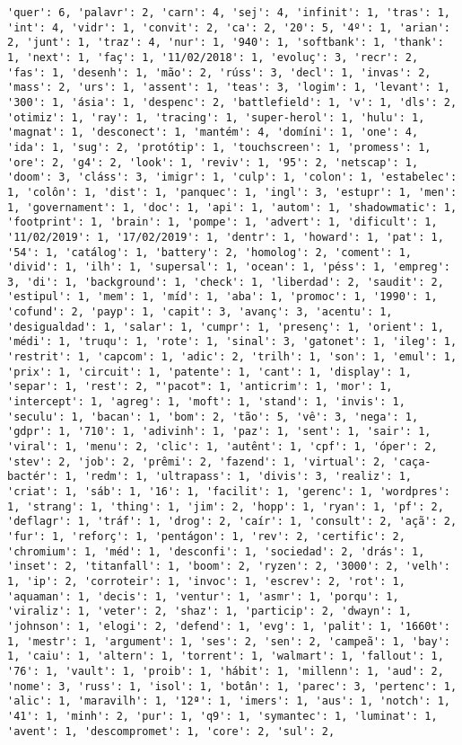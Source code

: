 \documentclass[11pt]{article}
\begin{document}
\begin{Verbatim}[commandchars=\\\{\}]
'quer': 6, 'palavr': 2, 'carn': 4, 'sej': 4, 'infinit': 1, 'tras': 1, 'int': 4, 'vidr': 1, 'convit': 2, 'ca': 2, '20': 5, '4º': 1, 'arian': 2, 'junt': 1, 'traz': 4, 'nur': 1, '940': 1, 'softbank': 1, 'thank': 1, 'next': 1, 'faç': 1, '11/02/2018': 1, 'evoluç': 3, 'recr': 2, 'fas': 1, 'desenh': 1, 'mão': 2, 'rúss': 3, 'decl': 1, 'invas': 2, 'mass': 2, 'urs': 1, 'assent': 1, 'teas': 3, 'logim': 1, 'levant': 1, '300': 1, 'ásia': 1, 'despenc': 2, 'battlefield': 1, 'v': 1, 'dls': 2, 'otimiz': 1, 'ray': 1, 'tracing': 1, 'super-herol': 1, 'hulu': 1, 'magnat': 1, 'desconect': 1, 'mantém': 4, 'domíni': 1, 'one': 4, 'ida': 1, 'sug': 2, 'protótip': 1, 'touchscreen': 1, 'promess': 1, 'ore': 2, 'g4': 2, 'look': 1, 'reviv': 1, '95': 2, 'netscap': 1, 'doom': 3, 'cláss': 3, 'imigr': 1, 'culp': 1, 'colon': 1, 'estabelec': 1, 'colôn': 1, 'dist': 1, 'panquec': 1, 'ingl': 3, 'estupr': 1, 'men': 1, 'governament': 1, 'doc': 1, 'api': 1, 'autom': 1, 'shadowmatic': 1, 'footprint': 1, 'brain': 1, 'pompe': 1, 'advert': 1, 'dificult': 1, '11/02/2019': 1, '17/02/2019': 1, 'dentr': 1, 'howard': 1, 'pat': 1, '54': 1, 'catálog': 1, 'battery': 2, 'homolog': 2, 'coment': 1, 'divid': 1, 'ilh': 1, 'supersal': 1, 'ocean': 1, 'péss': 1, 'empreg': 3, 'di': 1, 'background': 1, 'check': 1, 'liberdad': 2, 'saudit': 2, 'estipul': 1, 'mem': 1, 'míd': 1, 'aba': 1, 'promoc': 1, '1990': 1, 'cofund': 2, 'payp': 1, 'capit': 3, 'avanç': 3, 'acentu': 1, 'desigualdad': 1, 'salar': 1, 'cumpr': 1, 'presenç': 1, 'orient': 1, 'médi': 1, 'truqu': 1, 'rote': 1, 'sinal': 3, 'gatonet': 1, 'ileg': 1, 'restrit': 1, 'capcom': 1, 'adic': 2, 'trilh': 1, 'son': 1, 'emul': 1, 'prix': 1, 'circuit': 1, 'patente': 1, 'cant': 1, 'display': 1, 'separ': 1, 'rest': 2, "'pacot": 1, 'anticrim': 1, 'mor': 1, 'intercept': 1, 'agreg': 1, 'moft': 1, 'stand': 1, 'invis': 1, 'seculu': 1, 'bacan': 1, 'bom': 2, 'tão': 5, 'vê': 3, 'nega': 1, 'gdpr': 1, '710': 1, 'adivinh': 1, 'paz': 1, 'sent': 1, 'sair': 1, 'viral': 1, 'menu': 2, 'clic': 1, 'autênt': 1, 'cpf': 1, 'óper': 2, 'stev': 2, 'job': 2, 'prêmi': 2, 'fazend': 1, 'virtual': 2, 'caça-bactér': 1, 'redm': 1, 'ultrapass': 1, 'divis': 3, 'realiz': 1, 'criat': 1, 'sáb': 1, '16': 1, 'facilit': 1, 'gerenc': 1, 'wordpres': 1, 'strang': 1, 'thing': 1, 'jim': 2, 'hopp': 1, 'ryan': 1, 'pf': 2, 'deflagr': 1, 'tráf': 1, 'drog': 2, 'caír': 1, 'consult': 2, 'açã': 2, 'fur': 1, 'reforç': 1, 'pentágon': 1, 'rev': 2, 'certific': 2, 'chromium': 1, 'méd': 1, 'desconfi': 1, 'sociedad': 2, 'drás': 1, 'inset': 2, 'titanfall': 1, 'boom': 2, 'ryzen': 2, '3000': 2, 'velh': 1, 'ip': 2, 'corroteir': 1, 'invoc': 1, 'escrev': 2, 'rot': 1, 'aquaman': 1, 'decis': 1, 'ventur': 1, 'asmr': 1, 'porqu': 1, 'viraliz': 1, 'veter': 2, 'shaz': 1, 'particip': 2, 'dwayn': 1, 'johnson': 1, 'elogi': 2, 'defend': 1, 'evg': 1, 'palit': 1, '1660t': 1, 'mestr': 1, 'argument': 1, 'ses': 2, 'sen': 2, 'campeã': 1, 'bay': 1, 'caiu': 1, 'altern': 1, 'torrent': 1, 'walmart': 1, 'fallout': 1, '76': 1, 'vault': 1, 'proib': 1, 'hábit': 1, 'millenn': 1, 'aud': 2, 'nome': 3, 'russ': 1, 'isol': 1, 'botân': 1, 'parec': 3, 'pertenc': 1, 'alic': 1, 'maravilh': 1, '12ª': 1, 'imers': 1, 'aus': 1, 'notch': 1, '41': 1, 'minh': 2, 'pur': 1, 'q9': 1, 'symantec': 1, 'luminat': 1, 'avent': 1, 'descompromet': 1, 'core': 2, 'sul': 2, 
\end{Verbatim}
\end{document}
